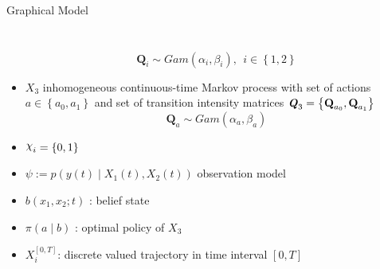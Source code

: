 \documentclass[
	english,%
	aspectratio=169,%
	color={accentcolor=3b},
	logo=true,%
	colorframetitle=false,%
	]{tudabeamer}
\DeclareRobustCommand{\rchi}{{\mathpalette\irchi\relax}}
\newcommand{\irchi}[2]{\raisebox{\depth}{$#1\chi$}}
\begin{document}
\begin{frame}{Graphical Model}
\begin{columns}[onlytextwidth,c]
\begin{itemize}
		\vspace{-0.1cm}
		\begin{equation}
		\textbf{Q}_{i} \sim Gam(\alpha_{i}, \beta_{i}),\ \ i \in \left\lbrace 1,2\right\rbrace 
		\end{equation}
		\item $X_{3} $ inhomogeneous continuous-time Markov process  with set of actions $ a \in \left\lbrace a_{0}, a_{1}\right\rbrace  $ and set of transition intensity matrices $ \textbf{\textit{Q}}_{3} = \left\lbrace \textbf{Q}_{a_{0}}, \textbf{Q}_{a_{1}} \right\rbrace  $
		\vspace{-0.1cm}
		\begin{equation}
		\textbf{Q}_{a} \sim Gam(\alpha_{a}, \beta_{a})
		\end{equation}
		\item $ \rchi_{i} = \left\lbrace 0,1\right\rbrace  $
		\item $ \psi  := p(y(t) \mid X_{1}(t), X_{2}(t)) $ observation model\\
		\item $  b(x_{1}, x_{2}; t) $ : belief state
		\item $ \pi(a \mid b) $ : optimal policy of $ X_{3} $
		\item $ X_{i}^{[0,T]} $: discrete valued trajectory in time interval $ [0, T] $
	\end{itemize}
\end{columns}
\end{frame}
\end{document}
